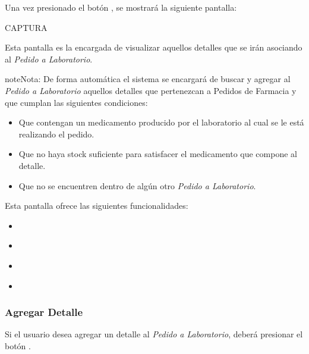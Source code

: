 \documentclass[a4paper,10pt,spanish]{sphinxmanual}
\begin{document}
Una vez presionado el botón , se mostrará la siguiente pantalla:

CAPTURA

Esta pantalla es la encargada de visualizar aquellos detalles que se irán asociando al \emph{Pedido a Laboratorio}.

\begin{notice}{note}{Nota:}
De forma automática el sistema se encargará de buscar y agregar al \emph{Pedido a Laboratorio} aquellos detalles que pertenezcan a Pedidos de Farmacia y que cumplan las siguientes condiciones:
\begin{itemize}
\item {} 
Que contengan un medicamento producido por el laboratorio al cual se le está realizando el pedido.

\item {} 
Que no haya stock suficiente para satisfacer el medicamento que compone al detalle.

\item {} 
Que no se encuentren dentro de algún otro \emph{Pedido a Laboratorio}.

\end{itemize}
\end{notice}

Esta pantalla ofrece las siguientes funcionalidades:
\begin{itemize}
\item {} 
{\hyperref[pedidosalab:agregar\string-detalle\string-pl]{}}

\item {} 
{\hyperref[pedidosalab:modificar\string-detalle\string-pl]{}}

\item {} 
{\hyperref[pedidosalab:eliminar\string-detalle\string-pl]{}}

\item {} 
{\hyperref[pedidosalab:registrar\string-pedido\string-pl]{}}

\end{itemize}


\subsubsection{Agregar Detalle}
\label{pedidosalab:agregar-detalle-pl}\label{pedidosalab:agregar-detalle}
Si el usuario desea agregar un detalle al \emph{Pedido a Laboratorio}, deberá presionar el botón .
\end{document}
